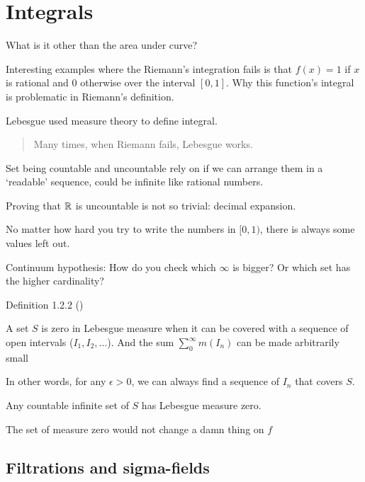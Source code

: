 \clearpage

\section{Integrals}

What is it other than the area under curve?

Interesting examples where the Riemann's integration fails is that
$f(x) = 1$ if $x$ is rational and $0$ otherwise over the interval $[0,1]$.
Why this function's integral is problematic in Riemann's definition.

Lebesgue used measure theory to define integral.

\begin{quote}
	Many times, when Riemann fails, Lebesgue works.
\end{quote}

Set being countable and uncountable rely on if we can arrange them in
a `readable' sequence, could be infinite like rational numbers.

Proving that $\mathbb{R}$ is uncountable is not so trivial: decimal expansion.

No matter how hard you try to write the numbers in $[0,1)$,
there is always some values left out.

Continuum hypothesis: How do you check which $\infty$ is bigger?
Or which set has the higher cardinality?

Definition 1.2.2 ()

\begin{example}
	A set $S$ is zero in Lebesgue measure
	when it can be covered with a sequence of open intervals ($I_1, I_2, \dots$).
	And the sum $\sum_{0}^{\infty} m(I_n)$ can be made arbitrarily small
\end{example}

In other words, for any $\epsilon > 0$, we can always find a sequence of $I_n$
that covers $S$.

\begin{thm}
	Any countable infinite set of $S$ has Lebesgue measure zero.
\end{thm}

\begin{remark}
	The set of measure zero would not change a damn thing on $f$
\end{remark}

\subsection{Filtrations and sigma-fields}

